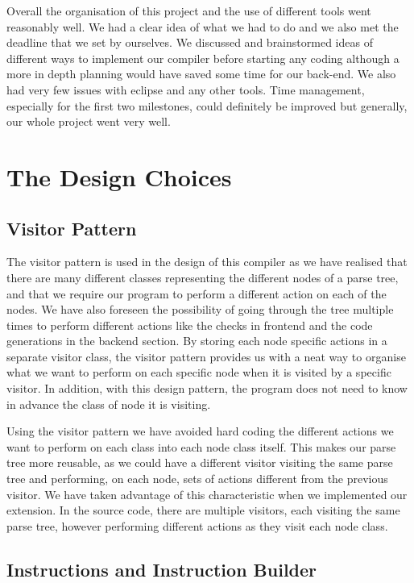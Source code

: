 \documentclass[11pt]{article}
\begin{document}
\medskip

Overall the organisation of this project and the use of different tools went reasonably well. We had a clear idea of what we had to do and we also met the deadline that we set by ourselves. We discussed and brainstormed ideas of different ways to implement our compiler before starting any coding although a more in depth planning would have saved some time for our back-end. We also had very few issues with eclipse and any other tools. Time management, especially for the first two milestones, could definitely be improved but generally, our whole project went very well. 

\section{The Design Choices}

\subsection{Visitor Pattern}

The visitor pattern is used in the design of this compiler as we have realised that there are many different classes representing the different nodes of a parse tree, and that we require our program to perform a different action on each of the nodes. We have also foreseen the possibility of going through the tree multiple times to perform different actions like the checks in frontend and the code generations in the backend section. By storing each node specific actions in a separate visitor class, the visitor pattern provides us with a neat way to organise what we want to perform on each specific node when it is visited by a specific visitor. In addition, with this design pattern, the program does not need to know in advance the class of node it is visiting. 

\medskip

Using the visitor pattern we have avoided hard coding the different actions we want to perform on each class into each node class itself. This makes our parse tree more reusable, as we could have a different visitor visiting the same parse tree and performing, on each node, sets of actions different from the previous visitor. We have taken advantage of this characteristic when we implemented our extension. In the source code, there are multiple visitors, each visiting the same parse tree, however performing different actions as they visit each node class. 

\subsection{Instructions and Instruction Builder}
\end{document}
